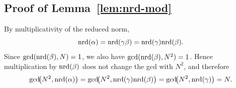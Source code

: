 




\subsection{Proof of Lemma~\ref{lem:nrd-mod}}
\label{subsec:nrd-mod}
By multiplicativity of the reduced norm,
\[
\mathrm{nrd}(\alpha)
=
\mathrm{nrd}(\gamma\beta)
=
\mathrm{nrd}(\gamma)\mathrm{nrd}(\beta).
\]
Since $\gcd(\mathrm{nrd}(\beta),N)=1$, we also have
$\gcd(\mathrm{nrd}(\beta),N^2)=1$.
Hence multiplication by $\mathrm{nrd}(\beta)$ does not change the gcd with $N^2$, and therefore
\[
\gcd\!\bigl(N^2,\mathrm{nrd}(\alpha)\bigr)
=
\gcd\!\bigl(N^2,\mathrm{nrd}(\gamma)\mathrm{nrd}(\beta)\bigr)
=
\gcd\!\bigl(N^2,\mathrm{nrd}(\gamma)\bigr)
=
N.
\]

